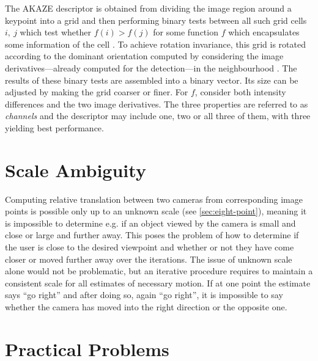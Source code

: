 The AKAZE descriptor is obtained from dividing the image region around a
keypoint into a grid and then performing binary tests between all such grid
cells $i,~j$ which test whether $f(i) > f(j)$ for some function $f$ which
encapsulates some information of the cell \citep{yang2012}. To achieve rotation
invariance, this grid is rotated according to the dominant orientation computed
by considering the image derivatives---already computed for the detection---in
the neighbourhood \citep{alcantarilla2012}. The results of these binary tests are
assembled into a binary vector. Its size can be adjusted by making the grid
coarser or finer. For $f$, \citet{alcantarilla2012} consider both intensity
differences and the two image derivatives. The three properties are referred to as
\emph{channels} and the descriptor may include one, two or all three of them,
with three yielding best performance.

\section{Scale Ambiguity}

Computing relative translation between two cameras from corresponding image
points is possible only up to an unknown scale (see \autoref{sec:eight-point}),
meaning it is impossible to determine e.g. if an object viewed by the camera is
small and close or large and further away.  This poses the problem of how to
determine if the user is close to the desired viewpoint and whether or not they
have come closer or moved further away over the iterations.  The issue of
unknown scale alone would not be problematic, but an iterative procedure
requires to maintain a consistent scale for all estimates of necessary motion.
If at one point the estimate says ``go right'' and after doing so, again ``go
right'', it is impossible to say whether the camera has moved into the right
direction or the opposite one.

\section{Practical Problems}
\label{sec:app_challenges}

